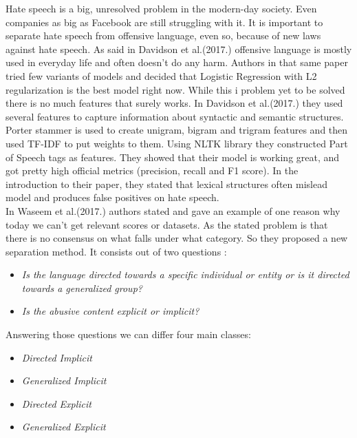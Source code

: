 \documentclass[10pt, a4paper]{article}
\begin{document}
Hate speech is a big, unresolved problem in the modern-day society. Even companies as big as Facebook are still struggling with it. It is important to separate hate speech from offensive language, even so, because of new laws against hate speech\cite{Davidson2017AutomatedHS}. As said in Davidson et al.(2017.) offensive language is mostly used in everyday life and often doesn't do any harm. Authors in that same paper tried few variants of models and decided that Logistic Regression with L2 regularization is the best model right now.
While this i problem yet to be solved there is no much features that surely works. In Davidson et al.(2017.) they used several features to capture information about syntactic and semantic structures. Porter stammer is used to create unigram, bigram and trigram features and then used TF-IDF to put weights to them. Using NLTK library they constructed Part of Speech tags as features. They showed that their model is working great, and got pretty high official metrics (precision, recall and F1 score). In the introduction to their paper, they stated that lexical structures often mislead model and produces false positives on hate speech.\cite{Davidson2017AutomatedHS}
\\In Waseem et al.(2017.) authors stated and gave an example of one reason why today we can't get relevant scores or datasets. As the stated problem is that there is no consensus on what falls under what category. So they proposed a new separation method. It consists out of two questions \cite{WaseemUnderstandingAbuse}:
\begin{itemize}
	\item \textit{Is the language directed towards a specific individual or entity or is it directed towards a generalized group?}
	\item \textit{Is the abusive content explicit or implicit?}
\end{itemize}
Answering those questions we can differ four main classes:
\begin{itemize}
	\item \textit{Directed Implicit}
	\item \textit{Generalized Implicit}
	\item \textit{Directed Explicit}
	\item \textit{Generalized Explicit}
\end{itemize}
\end{document}
